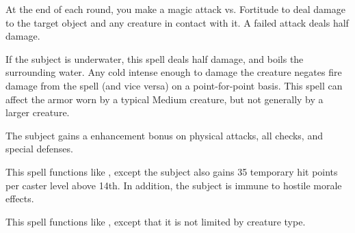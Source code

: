 \spelldur{\durshort \dismissable}
\begin{spelleffect}
    At the end of each round, you make a magic attack vs. Fortitude to deal damage to the target object and any creature in contact with it. A failed attack deals half damage.
\end{spelleffect}
\begin{spellnotes}
    If the subject is underwater, this spell deals half damage,  and boils the surrounding water. Any cold intense enough to damage the creature negates fire damage from the spell (and vice versa) on a point-for-point basis. This spell can affect the armor worn by a typical Medium creature, but not generally by a larger creature.
\end{spellnotes}

\spelldur{\durshort \dismissable}
\begin{spelleffect}
    The subject gains a  enhancement bonus on physical attacks, all checks, and special defenses. \spellbonusscalingdescription
\end{spelleffect}

\begin{spelleffect}
    This spell functions like , except the subject also gains 35 temporary hit points  per caster level above 14th. In addition, the subject is immune to hostile morale effects.
\end{spelleffect}

\begin{spelleffect}
    This spell functions like , except that it is not limited by creature type.
\end{spelleffect}

